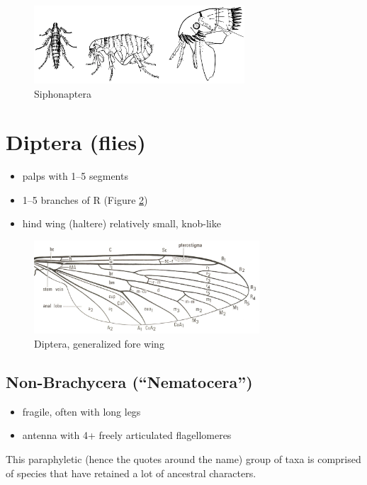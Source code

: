 \documentclass[letterpaper, 11pt]{article}
\begin{document}
\begin{figure}[ht!]
  \centering
    \includegraphics[width=0.7\textwidth]{siphonaptera.png}
  \caption{Siphonaptera \cite[modified from Figs. 33C–E in][]{snodgrass1944feeding}}
  \label{fig:pulicid}
\end{figure}

\section{Diptera (flies)}
\begin{itemize}
\item palps with 1--5 segments
\item 1--5 branches of R (Figure \ref{fig:dipteranwing})
\item hind wing (haltere) relatively small, knob-like
\end{itemize}

\begin{figure}[ht!]
  \centering
    \includegraphics[width=0.75\textwidth]{DipteraWing}
  \caption{Diptera, generalized fore wing \citep[][Fig. 67]{mcalpine1981manual}}
  \label{fig:dipteranwing}
\end{figure}

\subsection{Non-Brachycera (``Nematocera'')}
\begin{itemize}
\item fragile, often with long legs 
\item antenna with 4+ freely articulated flagellomeres
\end{itemize}
This paraphyletic (hence the quotes around the name) group of taxa is comprised of species that have retained a lot of ancestral characters. 
\end{document}
